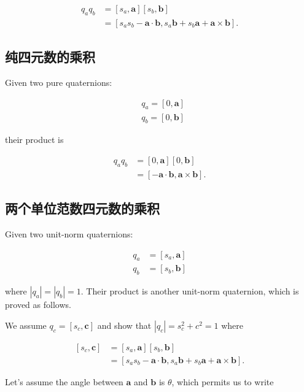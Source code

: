 $$
\begin{aligned}
q_{a} q_{b} & =\left[s_{a}, \mathbf{a}\right]\left[s_{b}, \mathbf{b}\right] \\
& =\left[s_{a} s_{b}-\mathbf{a} \cdot \mathbf{b}, s_{a} \mathbf{b}+s_{b} \mathbf{a}+\mathbf{a} \times \mathbf{b}\right] .
\end{aligned}
$$

\subsection{纯四元数的乘积}
Given two pure quaternions:

$$
\begin{aligned}
& q_{a}=[0, \mathbf{a}] \\
& q_{b}=[0, \mathbf{b}]
\end{aligned}
$$

their product is

$$
\begin{aligned}
q_{a} q_{b} & =[0, \mathbf{a}][0, \mathbf{b}] \\
& =[-\mathbf{a} \cdot \mathbf{b}, \mathbf{a} \times \mathbf{b}] .
\end{aligned}
$$

\subsection{两个单位范数四元数的乘积}
Given two unit-norm quaternions:

$$
\begin{aligned}
q_{a} & =\left[s_{a}, \mathbf{a}\right] \\
q_{b} & =\left[s_{b}, \mathbf{b}\right]
\end{aligned}
$$

where $\left|q_{a}\right|=\left|q_{b}\right|=1$. Their product is another unit-norm quaternion, which is proved as follows.

We assume $q_{c}=\left[s_{c}, \mathbf{c}\right]$ and show that $\left|q_{c}\right|=s_{c}^{2}+c^{2}=1$ where

$$
\begin{aligned}
{\left[s_{c}, \mathbf{c}\right] } & =\left[s_{a}, \mathbf{a}\right]\left[s_{b}, \mathbf{b}\right] \\
& =\left[s_{a} s_{b}-\mathbf{a} \cdot \mathbf{b}, s_{a} \mathbf{b}+s_{b} \mathbf{a}+\mathbf{a} \times \mathbf{b}\right] .
\end{aligned}
$$

Let's assume the angle between $\mathbf{a}$ and $\mathbf{b}$ is $\theta$, which permits us to write

